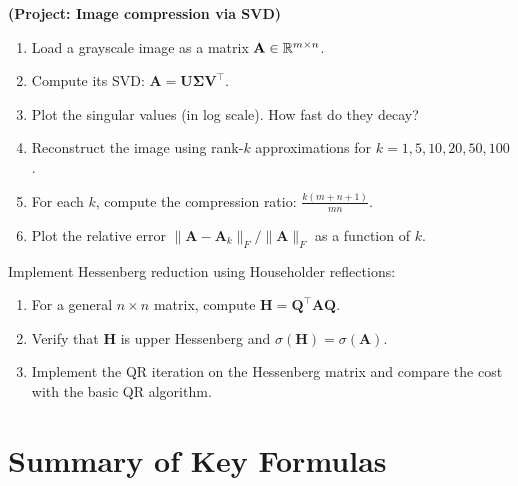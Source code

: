 \begin{exercise}[$\star\star\star$]
\label{ex:ch10-image-compression}
\textbf{(Project: Image compression via SVD)}
\begin{enumerate}
    \item Load a grayscale image as a matrix $\mathbf{A} \in \mathbb{R}^{m \times n}$.
    \item Compute its SVD: $\mathbf{A} = \mathbf{U}\boldsymbol{\Sigma}\mathbf{V}^\top$.
    \item Plot the singular values (in log scale). How fast do they decay?
    \item Reconstruct the image using rank-$k$ approximations for $k = 1, 5, 10, 20, 50, 100$.
    \item For each $k$, compute the compression ratio: $\frac{k(m+n+1)}{mn}$.
    \item Plot the relative error $\|\mathbf{A} - \mathbf{A}_k\|_F / \|\mathbf{A}\|_F$ as a function of $k$.
\end{enumerate}
\end{exercise}

\begin{exercise}[$\star\star\star$]
\label{ex:ch10-hessenberg}
Implement Hessenberg reduction using Householder reflections:
\begin{enumerate}
    \item For a general $n \times n$ matrix, compute $\mathbf{H} = \mathbf{Q}^\top\mathbf{A}\mathbf{Q}$.
    \item Verify that $\mathbf{H}$ is upper Hessenberg and $\sigma(\mathbf{H}) = \sigma(\mathbf{A})$.
    \item Implement the QR iteration on the Hessenberg matrix and compare the cost with the basic QR algorithm.
\end{enumerate}
\end{exercise}

\section*{Summary of Key Formulas}

